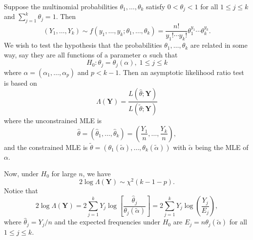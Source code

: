 \documentclass[10pt]{article}
\theoremstyle{newstyle}
\begin{document}
Suppose the multinomial probabilities $\theta_1, \dots, \theta_k$ satisfy 
$0 < \theta_j < 1$ for all $1 \leq j \leq k$ and $\sum_{j=1}^k \theta_j = 1$. Then 
\[ (Y_1, \dots, Y_k) \sim f(y_1, \dots, y_k; \theta_1, \dots, \theta_k) 
= \frac{n!}{y_1!\cdots y_k!} \theta_1^{y_1} \cdots \theta_k^{y_k}. \]
We wish to test the hypothesis that the probabilities $\theta_1, \dots, \theta_k$ are related in some 
way, say they are all functions of a parameter $\alpha$ such that 
\[ H_0 : \theta_j = \theta_j(\alpha), \; 1 \leq j \leq k \]
where $\alpha = (\alpha_1, \dots, \alpha_p)$ and $p < k-1$. Then an asymptotic likelihood ratio test is 
based on 
\[ \Lambda(\mathbf Y) = \frac{L(\hat\theta; \mathbf Y)}{L(\tilde\theta; \mathbf Y)} \]
where the unconstrained MLE is 
\[ \hat\theta = (\hat\theta_1, \dots, \hat\theta_k) = \left( \frac{Y_1}n, \dots, \frac{Y_k}n \right), \]
and the constrained MLE is 
$\tilde\theta = (\theta_1(\tilde\alpha), \dots, \theta_k(\tilde\alpha))$
with $\tilde\alpha$ being the MLE of $\alpha$. 

Now, under $H_0$ for large $n$, we have 
\[ 2 \log\Lambda(\mathbf Y) \sim \chi^2(k-1-p). \]
Notice that 
\[ 2\log\Lambda(\mathbf Y) = 2\sum_{j=1}^k Y_j \log \left[ \frac{\hat\theta_j}{\theta_j(\tilde\alpha)} \right] = 2\sum_{j=1}^k Y_j \log \left( \frac{Y_j}{E_j} \right), \] 
where $\hat\theta_j = Y_j/n$ and the expected frequencies under $H_0$ are 
$E_j = n\theta_j(\tilde\alpha)$
for all $1 \leq j \leq k$. 
\end{document}
